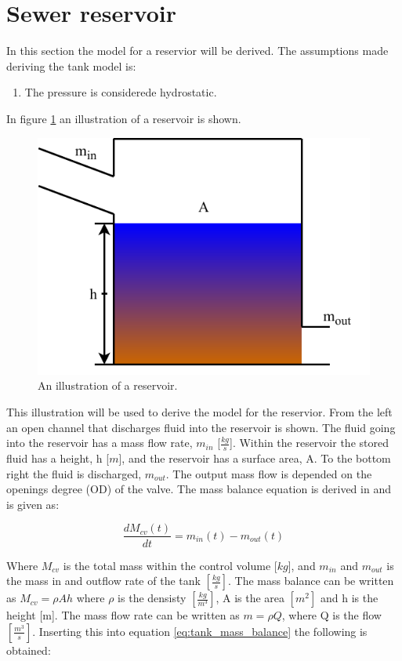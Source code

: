 \section{Sewer reservoir}\label{se:sewer_reservoir}
In this section the model for a reservior will be derived. 
The assumptions made deriving the tank model is:
\begin{table}[H]
\begin{enumerate}
\item The pressure is considerede hydrostatic.
\end{enumerate}
\end{table}

In figure \ref{fig:tank_model} an illustration of a reservoir is shown.
\begin{figure}[H]
\centering
\includegraphics[width=.6\textwidth]{report/modeling/pictures/reservior.pdf}
\caption{An illustration of a reservoir.}
\label{fig:tank_model}
\end{figure} 

This illustration will be used to derive the model for the reservior. From the left an open channel that discharges fluid into the reservoir is shown. The fluid going into the reservoir has a mass flow rate, $m_{in}$ [$\frac{kg}{s}$]. Within the reservoir the stored fluid has a height, h [$m$], and the reservoir has a surface area, A. To the bottom right the fluid is discharged, $m_{out}$. The output mass flow is depended on the openings degree (OD) of the valve. The mass balance equation is derived in \cite{model_tank} and is given as:


\begin{equation}
	 	\frac{dM_{cv}(t)}{dt}=m_{in}(t)-m_{o ut}(t)
\label{eq:tank_mass_balance}
\end{equation} 

Where $M_{cv}$ is the total mass within the control volume [$kg$], and $m_{in}$ and $m_{out}$ is the mass in and outflow rate of the tank $\left[\frac{kg}{s}\right]$. The mass balance can be written as $M_{cv} = \rho Ah$ where $\rho$ is the densisty $\left[\frac{kg}{m^3}\right]$, A is the area $\left[m^2\right]$ and h is the height [m]. The mass flow rate can be written as $m = \rho Q$, where Q is the flow $\left[\frac{m^3}{s}\right]$. Inserting this into equation \ref{eq:tank_mass_balance} the following is obtained:

